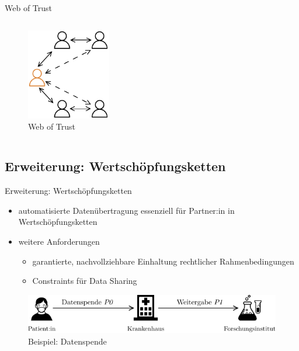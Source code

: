 \begin{frame}{Web of Trust \footnotesize\cite{sambraSolidPlatformDecentralized2016}}
\begin{columns}
        \begin{column}{0.4\textwidth}
            \vspace{1em}
            \begin{figure}
                \includegraphics[height=4cm]{./assets/web_of_trust.drawio.pdf}
                \caption{Web of Trust}
            \end{figure}
        \end{column}
    \end{columns}
\end{frame}


\subsection{Erweiterung: Wertschöpfungsketten}

\begin{frame}{Erweiterung: Wertschöpfungsketten \footnotesize\cite{bothSolidBasedB2BData2025}}
    \begin{itemize}
        \item automatisierte Datenübertragung essenziell für Partner:in in Wertschöpfungsketten
        \item weitere Anforderungen
        \begin{itemize}
            \item garantierte, nachvollziehbare Einhaltung rechtlicher Rahmenbedingungen
            \item Constraints für Data Sharing
        \end{itemize}
    \end{itemize}

    \begin{figure}
        \includegraphics[width=\textwidth]{./assets/example_horizontal.drawio.pdf}
        \caption{Beispiel: Datenspende}
    \end{figure}
\end{frame}



